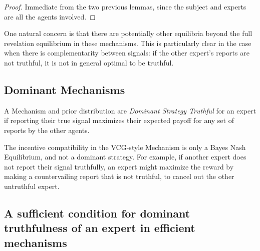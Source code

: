 \begin{proof}
Immediate from the two previous lemmas, since the subject and experts are all the agents involved.
\end{proof}

One natural concern is that there are potentially other equilibria beyond the full revelation equilibrium in these mechanisms. This is particularly clear in the case when there is complementarity between signals: if the other expert's reports are not truthful, it is not in general optimal to be truthful.


\subsection{Dominant Mechanisms}

\begin{defn}
	A Mechanism and prior distribution are \emph{Dominant Strategy Truthful} for an expert if reporting their true signal maximizes their expected payoff for any set of reports by the other agents. 
\end{defn}

The incentive compatibility in the VCG-style Mechanism is only a Bayes Nash Equilibrium, and not a dominant strategy. For example, if another expert does not report their signal truthfully, an expert might maximize the reward by making a countervailing report that is not truthful, to cancel out the other untruthful expert. 



\subsection{A sufficient condition for dominant truthfulness of an expert in efficient mechanisms}


